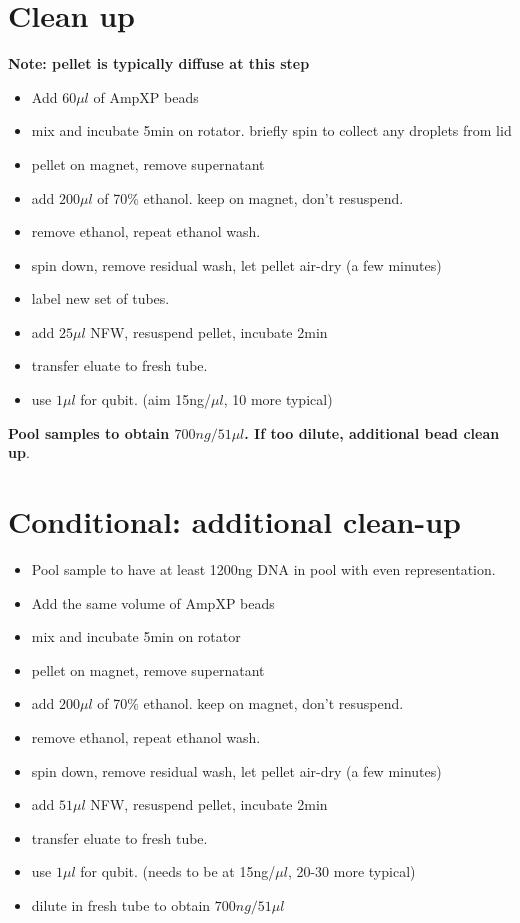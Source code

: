 \documentclass[aps,rmp]{revtex4}
\begin{document}
\section*{Clean up}
{\bf  Note: pellet is typically diffuse at this step}
\begin{itemize}
	\item Add $60\mu l$ of AmpXP beads
	\item mix and incubate 5min on rotator. briefly spin to collect any droplets from lid
	\item pellet on magnet, remove supernatant
	\item add $200\mu l$ of 70\% ethanol. keep on magnet, don't resuspend.
	\item remove ethanol, repeat ethanol wash.
	\item spin down, remove residual wash, let pellet air-dry (a few minutes)
	\item label new set of tubes.
	\item add $25\mu l$ NFW, resuspend pellet, incubate 2min
	\item transfer eluate to fresh tube.
	\item use $1\mu l$ for qubit. (aim 15ng/$\mu l$, 10 more typical)
\end{itemize}
{\bf Pool samples to obtain $700ng/51\mu l$. If too dilute, additional bead clean up}.

\section*{Conditional: additional clean-up}
\begin{itemize}
	\item Pool sample to have at least 1200ng DNA in pool with even representation.
	\item Add the same volume of AmpXP beads
	\item mix and incubate 5min on rotator
	\item pellet on magnet, remove supernatant
	\item add $200\mu l$ of 70\% ethanol. keep on magnet, don't resuspend.
	\item remove ethanol, repeat ethanol wash.
	\item spin down, remove residual wash, let pellet air-dry (a few minutes)
	\item add $51\mu l$ NFW, resuspend pellet, incubate 2min
	\item transfer eluate to fresh tube.
	\item use $1\mu l$ for qubit. (needs to be at 15ng/$\mu l$, 20-30 more typical)
	\item dilute in fresh tube to obtain $700ng/51\mu l$
\end{itemize}
\end{document}
